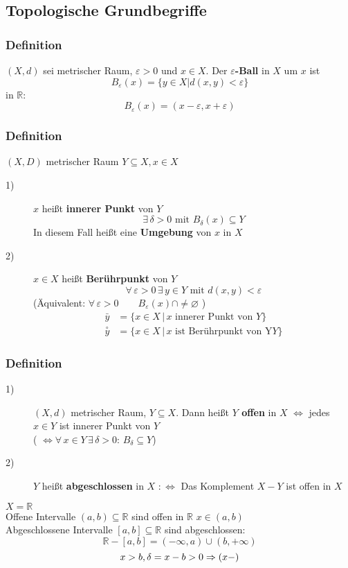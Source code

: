 \subsection{Topologische Grundbegriffe} %
\label{sub:topologische_grundbegriffe}
\subsubsection{Definition} %
\label{ssub:definition}
 $(X,d)$ sei metrischer Raum, $\varepsilon >0$ und $x \in X$. Der {\bfseries $\varepsilon $-Ball} in $X$ um $x$ ist
 \[
 	B_{\varepsilon }(x) = \{ y \in X | d(x,y)< \varepsilon \}
 \]
 in $\mathbb{R}$: \[
 	B_{\varepsilon}(x)=(x-\varepsilon ,x+ \varepsilon)
 \]
\subsubsection{Definition} %
\label{ssub:definition}
$(X,D)$ metrischer Raum $Y \subseteq X, x \in X$
\begin{description}
	\item[1)] $x$ heißt {\bfseries innerer Punkt} von $Y$  \[
		\exists\, \delta>0 \text{ mit } B_{\delta }(x) \subseteq Y
	\]
	In diesem Fall heißt eine {\bfseries Umgebung} von $x$ in $X$
	\item[2)] $x \in X$ heißt {\bfseries Berührpunkt} von $Y$
	\[
		\forall\, \varepsilon >0 \, \exists\, y \in Y \text{ mit } d(x,y)<\varepsilon 
	\]
	(Äquivalent: $\forall\, \varepsilon > 0 \qquad B_{\varepsilon }(x)\cap \neq \varnothing$ )
	\begin{align*}
		\bar{y} &= \{ x \in X \,|\, x \text{ innerer Punkt von } Y \} \\
		\overset{\circ}{y} &= \{ x \in X \,|\, x \text{ ist Berührpunkt von Y} Y \} 
	\end{align*}
\end{description}
\subsubsection{Definition} %
\label{ssub:definition}
\begin{description}
	\item[1)] $(X,d)$ metrischer Raum, $Y \subseteq X$. Dann heißt {\bfseries $Y$ offen} in $X$ $\Leftrightarrow $ jedes $x \in Y$ ist innerer Punkt von $Y$ \\
	( $\Leftrightarrow \forall\, x \in Y \, \exists \, \delta >0: \, B_{\delta } \subseteq Y$)
	\item[2)] $Y$ heißt {\bfseries abgeschlossen} in $X$ $:\Leftrightarrow $ Das Komplement $X-Y$ ist offen in $X$
\end{description}
 $X=\mathbb{R}$ \\
 Offene Intervalle $(a,b) \subseteq \mathbb{R}$ sind offen in $\mathbb{R}$ $x \in (a,b)$ \\
 Abgeschlossene Intervalle $[a,b] \subseteq \mathbb{R}$ sind abgeschlossen: \[
 	\mathbb{R} - [a,b] = (-\infty,a) \cup (b, +\infty)
 \]
\[
	x>b , \delta = x-b >0 \\
	\Rightarrow (x- )
\]

	
